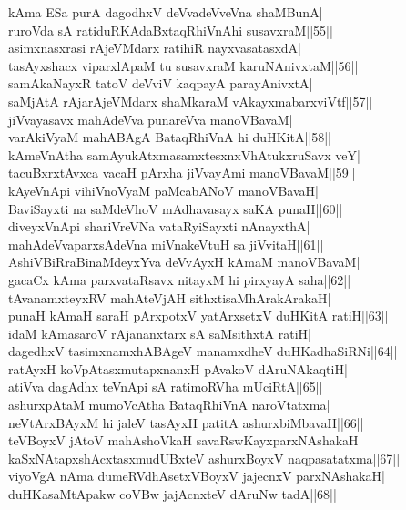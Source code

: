 \documentclass{article}
\begin{document}
kAma ESa purA dagodhxV deVvadeVveVna shaMBunA|\\
ruroVda sA ratiduRKAdaBxtaqRhiVnAhi susavxraM||55||\\
asimxnasxrasi rAjeVMdarx ratihiR nayxvasatasxdA|\\
tasAyxshacx viparxlApaM tu susavxraM karuNAnivxtaM||56||\\
samAkaNayxR tatoV deVviV kaqpayA parayAnivxtA|\\
saMjAtA rAjarAjeVMdarx shaMkaraM vAkayxmabarxviVtf||57||\\
jiVvayasavx mahAdeVva punareVva manoVBavaM|\\
varAkiVyaM mahABAgA BataqRhiVnA hi duHKitA||58||\\
kAmeVnAtha samAyukAtxmasamxtesxnxVhAtukxruSavx veY|\\
tacuBxrxtAvxca vacaH pArxha jiVvayAmi manoVBavaM||59||\\
kAyeVnApi vihiVnoVyaM paMcabANoV manoVBavaH|\\
BaviSayxti na saMdeVhoV mAdhavasayx saKA punaH||60||\\
diveyxVnApi shariVreVNa vataRyiSayxti nAnayxthA|\\
mahAdeVvaparxsAdeVna miVnakeVtuH sa jiVvitaH||61||\\
AshiVBiRraBinaMdeyxYva deVvAyxH kAmaM manoVBavaM|\\
gacaCx kAma parxvataRsavx nitayxM hi pirxyayA saha||62||\\
tAvanamxteyxRV mahAteVjAH sithxtisaMhArakArakaH|\\
punaH kAmaH saraH pArxpotxV yatArxsetxV duHKitA ratiH||63||\\
idaM kAmasaroV rAjananxtarx sA saMsithxtA ratiH|\\
dagedhxV tasimxnamxhABAgeV manamxdheV duHKadhaSiRNi||64||\\
ratAyxH koVpAtasxmutapxnanxH pAvakoV dAruNAkaqtiH|\\
atiVva dagAdhx teVnApi sA ratimoRVha mUciRtA||65||\\
ashurxpAtaM mumoVcAtha BataqRhiVnA naroVtatxma|\\
neVtArxBAyxM hi jaleV tasAyxH patitA ashurxbiMbavaH||66||\\
teVBoyxV jAtoV mahAshoVkaH savaRswKayxparxNAshakaH|\\
kaSxNAtapxshAcxtasxmudUBxteV ashurxBoyxV naqpasatatxma||67||\\
viyoVgA nAma dumeRVdhAsetxVBoyxV jajecnxV parxNAshakaH|\\
duHKasaMtApakw coVBw jajAcnxteV dAruNw tadA||68||\\
\end{document}
